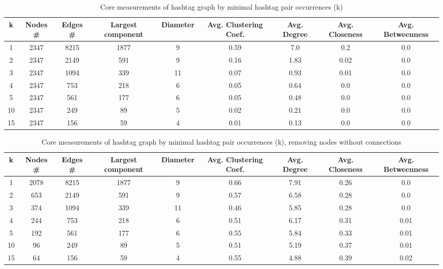 \documentclass[conference]{IEEEtran}
\begin{document}
    \begin{table}[ht]
        \begin{tabular} { | c | c | c | c | c | c | c | c | c | }
            \hline
            k & Nodes \# & Edges \# & Largest component & Diameter & Avg. Clustering Coef. & Avg. Degree
            & Avg. Closeness
            & Avg. Betweenness
            \\
            \hline
            1  & 2347 & 8215 & 1877 & 9  & 0.59 & 7.0  & 0.2  & 0.0 \\
            \hline
            2  & 2347 & 2149 & 591  & 9  & 0.16 & 1.83 & 0.02 & 0.0 \\
            \hline
            3  & 2347 & 1094 & 339  & 11 & 0.07 & 0.93 & 0.01 & 0.0 \\
            \hline
            4  & 2347 & 753  & 218  & 6  & 0.05 & 0.64 & 0.0  & 0.0 \\
            \hline
            5  & 2347 & 561  & 177  & 6  & 0.05 & 0.48 & 0.0  & 0.0 \\
            \hline
            10 & 2347 & 249  & 89   & 5  & 0.02 & 0.21 & 0.0  & 0.0 \\
            \hline
            15 & 2347 & 156  & 59   & 4  & 0.01 & 0.13 & 0.0  & 0.0 \\
            \hline

        \end{tabular}
        \caption {Core measurements of hashtag graph by minimal hashtag pair occurrences (k)}
        \label {tab:graphstats-by-k}
    \end{table}

    \begin{table}[ht]
        \begin{tabular} { | c | c | c | c | c | c | c | c | c | }
            \hline
            k & Nodes \# & Edges \# & Largest component & Diameter & Avg. Clustering Coef. & Avg. Degree
            & Avg. Closeness
            & Avg. Betweenness
            \\
            \hline
            1  & 2078 & 8215 & 1877 & 9  & 0.66 & 7.91 & 0.26 & 0.0  \\
            \hline
            2  & 653  & 2149 & 591  & 9  & 0.57 & 6.58 & 0.28 & 0.0  \\
            \hline
            3  & 374  & 1094 & 339  & 11 & 0.46 & 5.85 & 0.28 & 0.0  \\
            \hline
            4  & 244  & 753  & 218  & 6  & 0.51 & 6.17 & 0.31 & 0.01 \\
            \hline
            5  & 192  & 561  & 177  & 6  & 0.55 & 5.84 & 0.33 & 0.01 \\
            \hline
            10 & 96   & 249  & 89   & 5  & 0.51 & 5.19 & 0.37 & 0.01 \\
            \hline
            15 & 64   & 156  & 59   & 4  & 0.55 & 4.88 & 0.39 & 0.02 \\
            \hline

        \end{tabular}
        \caption {Core measurements of hashtag graph by minimal hashtag pair occurrences (k), removing nodes without connections}
        \label {tab:graphstats-by-k-no-connect}
    \end{table}
\end{document}
